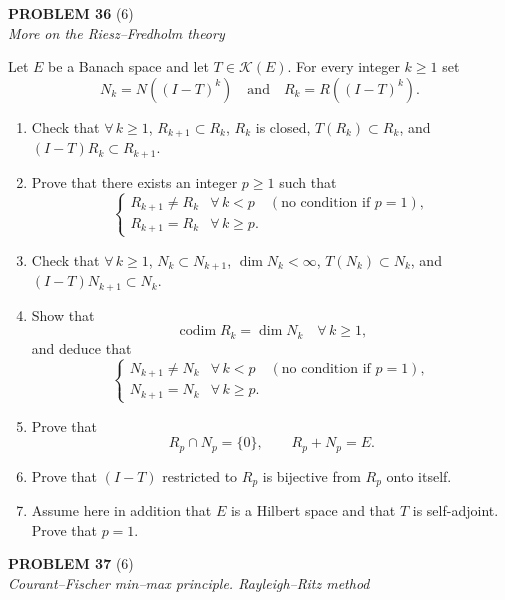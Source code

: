\documentclass[12pt]{article}
\begin{document}
\bigskip
 
\noindent\textbf{PROBLEM 36} (6)\\[4pt]
\textit{More on the Riesz--Fredholm theory}
 
\medskip
 
Let $E$ be a Banach space and let $T \in \mathcal{K}(E)$. For every integer $k \ge 1$ set
\[
N_k = N((I-T)^k) \quad \text{and} \quad R_k = R((I-T)^k).
\]
 
\begin{enumerate}
\item Check that $\forall\, k \ge 1$, $R_{k+1} \subset R_k$, $R_k$ is closed, $T(R_k) \subset R_k$,
and $(I-T)R_k \subset R_{k+1}$.
 
\item Prove that there exists an integer $p \ge 1$ such that
\[
\begin{cases}
R_{k+1} \neq R_k & \forall\, k < p \quad (\text{no condition if } p = 1),\\
R_{k+1} = R_k & \forall\, k \ge p.
\end{cases}
\]
 
\item Check that $\forall\, k \ge 1$, $N_k \subset N_{k+1}$, $\dim N_k < \infty$, $T(N_k) \subset N_k$,
and $(I-T)N_{k+1} \subset N_k$.
 
\item Show that
\[
\operatorname{codim} R_k = \dim N_k \quad \forall\, k \ge 1,
\]
and deduce that
\[
\begin{cases}
N_{k+1} \neq N_k & \forall\, k < p \quad (\text{no condition if } p = 1),\\
N_{k+1} = N_k & \forall\, k \ge p.
\end{cases}
\]
 
\item Prove that
\[
R_p \cap N_p = \{0\}, \qquad R_p + N_p = E.
\]
 
\item Prove that $(I-T)$ restricted to $R_p$ is bijective from $R_p$ onto itself.
 
\item Assume here in addition that $E$ is a Hilbert space and that $T$ is self-adjoint.
Prove that $p = 1$.
\end{enumerate}
 
\bigskip
 
\noindent\textbf{PROBLEM 37} (6)\\[4pt]
\textit{Courant--Fischer min--max principle. Rayleigh--Ritz method}
 
\end{document}
